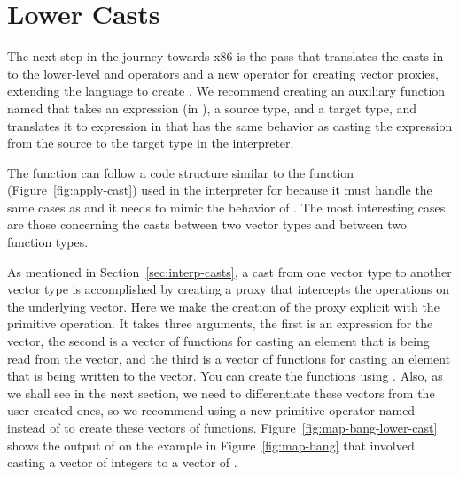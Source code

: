 \documentclass[7x10,nocrop]{TimesAPriori_MIT}%
\begin{document}
\section{Lower Casts}
\label{sec:lower-casts}

The next step in the journey towards x86 is the 
pass that translates the casts in \LangCast{} to the lower-level
 and  operators and a new operator for
creating vector proxies, extending the \LangLoop{} language to create
\LangProxy{}. We recommend creating an auxiliary function named
 that takes an expression (in \LangCast{}), a source type,
and a target type, and translates it to expression in \LangProxy{} that has
the same behavior as casting the expression from the source to the
target type in the interpreter.

The  function can follow a code structure similar to
the  function (Figure~\ref{fig:apply-cast}) used in
the interpreter for \LangCast{} because it must handle the same cases as
 and it needs to mimic the behavior of
. The most interesting cases are those concerning the
casts between two vector types and between two function types.

As mentioned in Section~\ref{sec:interp-casts}, a cast from one vector
type to another vector type is accomplished by creating a proxy that
intercepts the operations on the underlying vector. Here we make the
creation of the proxy explicit with the  primitive
operation. It takes three arguments, the first is an expression for
the vector, the second is a vector of functions for casting an element
that is being read from the vector, and the third is a vector of
functions for casting an element that is being written to the vector.
You can create the functions using . Also, as we shall
see in the next section, we need to differentiate these vectors from
the user-created ones, so we recommend using a new primitive operator
named  instead of  to create these
vectors of functions. Figure~\ref{fig:map-bang-lower-cast} shows
the output of  on the example in
Figure~\ref{fig:map-bang} that involved casting a vector of
integers to a vector of .
\end{document}
